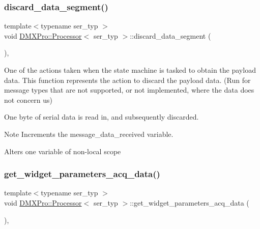 \subsubsection{\texorpdfstring{discard\+\_\+data\+\_\+segment()}{discard\_data\_segment()}}
{\footnotesize\ttfamily template$<$typename ser\+\_\+typ $>$ \\
void \hyperlink{classDMXPro_1_1Processor}{D\+M\+X\+Pro\+::\+Processor}$<$ ser\+\_\+typ $>$\+::discard\+\_\+data\+\_\+segment (\begin{DoxyParamCaption}{ }\end{DoxyParamCaption})\hspace{0.3cm}{\ttfamily [inline]}, {\ttfamily [private]}}



One of the actions taken when the state machine is tasked to obtain the payload data. This function represents the action to discard the payload data. (Run for message types that are not supported, or not implemented, where the data does not concern us) 

One byte of serial data is read in, and subsequently discarded.

\begin{DoxyNote}{Note}
Increments the message\+\_\+data\+\_\+received variable.
\end{DoxyNote}
Alters one variable of non-\/local scope \mbox{\label{classDMXPro_1_1Processor_aa2e16c41e09b7823570132f02d57ba34}} 
\subsubsection{\texorpdfstring{get\+\_\+widget\+\_\+parameters\+\_\+acq\+\_\+data()}{get\_widget\_parameters\_acq\_data()}}
{\footnotesize\ttfamily template$<$typename ser\+\_\+typ $>$ \\
void \hyperlink{classDMXPro_1_1Processor}{D\+M\+X\+Pro\+::\+Processor}$<$ ser\+\_\+typ $>$\+::get\+\_\+widget\+\_\+parameters\+\_\+acq\+\_\+data (\begin{DoxyParamCaption}{ }\end{DoxyParamCaption})\hspace{0.3cm}{\ttfamily [inline]}, {\ttfamily [private]}}

